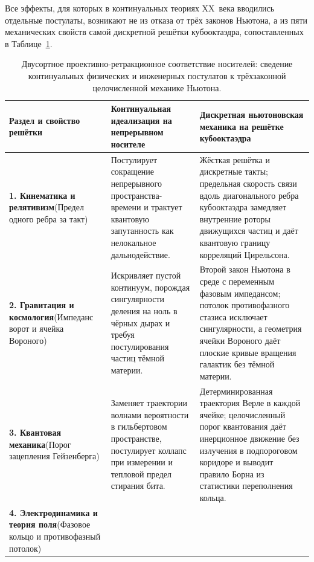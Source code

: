 Все эффекты, для которых в континуальных теориях XX~века вводились отдельные постулаты, возникают не из отказа от трёх законов Ньютона, а из пяти механических свойств самой дискретной решётки кубооктаэдра, сопоставленных в Таблице~\ref{tab:mono-newtonian-homeomorphism}.

\begin{table}[htbp]
\centering
\caption{Двусортное проективно-ретракционное соответствие носителей: сведение континуальных физических и инженерных постулатов к трёхзаконной целочисленной механике Ньютона.}
\label{tab:mono-newtonian-homeomorphism}
\footnotesize
\begin{tabular}{@{}p{}p{}p{}@{}}
\toprule
\textbf{Раздел и свойство решётки} & \textbf{Континуальная идеализация на непрерывном носителе} & \textbf{Дискретная ньютоновская механика на решётке кубооктаэдра} \\
\midrule
\textbf{1. Кинематика и релятивизм}\newline (Предел одного ребра за такт) &
Постулирует сокращение непрерывного пространства-времени и трактует квантовую запутанность как нелокальное дальнодействие. &
Жёсткая решётка и дискретные такты; предельная скорость связи вдоль диагонального ребра кубооктаэдра замедляет внутренние роторы движущихся частиц и даёт квантовую границу корреляций Цирельсона. \\
\addlinespace[3pt]
\textbf{2. Гравитация и космология}\newline (Импеданс ворот и ячейка Вороного) &
Искривляет пустой континуум, порождая сингулярности деления на ноль в чёрных дырах и требуя постулирования частиц тёмной материи. &
Второй закон Ньютона в среде с переменным фазовым импедансом; потолок противофазного стазиса исключает сингулярности, а геометрия ячейки Вороного даёт плоские кривые вращения галактик без тёмной материи. \\
\addlinespace[3pt]
\textbf{3. Квантовая механика}\newline (Порог зацепления Гейзенберга) &
Заменяет траектории волнами вероятности в гильбертовом пространстве, постулирует коллапс при измерении и тепловой предел стирания бита. &
Детерминированная траектория Верле в каждой ячейке; целочисленный порог квантования даёт инерционное движение без излучения в подпороговом коридоре и выводит правило Борна из статистики переполнения кольца. \\
\addlinespace[3pt]
\textbf{4. Электродинамика и теория поля}\newline (Фазовое кольцо и противофазный потолок) &

\end{tabular}
\end{table}
